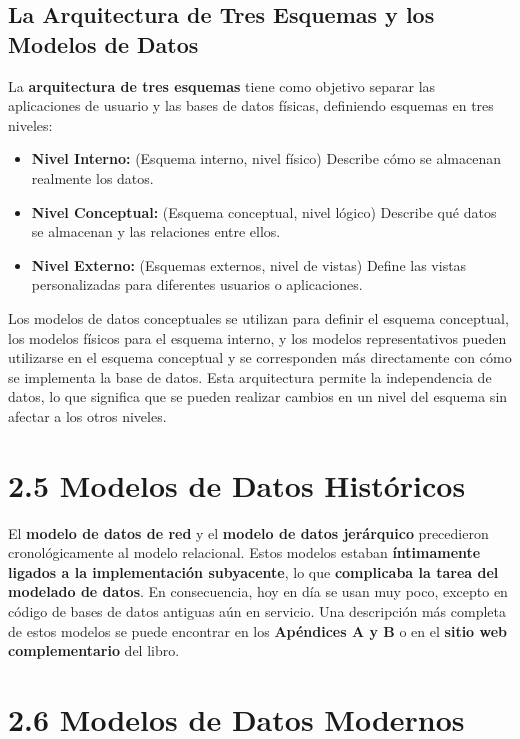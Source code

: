 \subsection{La Arquitectura de Tres Esquemas y los Modelos de Datos}

La \textbf{arquitectura de tres esquemas} tiene como objetivo separar las aplicaciones de usuario y las bases de datos físicas, definiendo esquemas en tres niveles:

\begin{itemize}
    \item \textbf{Nivel Interno:} (Esquema interno, nivel físico) Describe cómo se almacenan realmente los datos.
    \item \textbf{Nivel Conceptual:} (Esquema conceptual, nivel lógico) Describe qué datos se almacenan y las relaciones entre ellos.
    \item \textbf{Nivel Externo:} (Esquemas externos, nivel de vistas) Define las vistas personalizadas para diferentes usuarios o aplicaciones.
\end{itemize}

Los modelos de datos conceptuales se utilizan para definir el esquema conceptual, los modelos físicos para el esquema interno, y los modelos representativos pueden utilizarse en el esquema conceptual y se corresponden más directamente con cómo se implementa la base de datos.  Esta arquitectura permite la independencia de datos, lo que significa que se pueden realizar cambios en un nivel del esquema sin afectar a los otros niveles.

\section{2.5 Modelos de Datos Históricos}

El \textbf{modelo de datos de red} y el \textbf{modelo de datos jerárquico} precedieron cronológicamente al modelo relacional.  Estos modelos estaban \textbf{íntimamente ligados a la implementación subyacente}, lo que \textbf{complicaba la tarea del modelado de datos}.  En consecuencia, hoy en día se usan muy poco, excepto en código de bases de datos antiguas aún en servicio. Una descripción más completa de estos modelos se puede encontrar en los \textbf{Apéndices A y B} o en el \textbf{sitio web complementario} del libro.

\section{2.6 Modelos de Datos Modernos}

